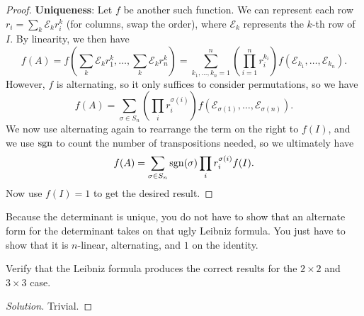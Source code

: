 \begin{proof}
\textbf{Uniqueness}: Let $f$ be another such function. We can represent
each row $r_i = \sum_k \mathcal{E}_k r_i^k$ (for columns, swap the
order), where $\mathcal{E}_k$ represents the $k$-th row of $I$. By
linearity, we then have
\[ f(A) = f\left(\sum_k \mathcal{E}_k r_1^k, \dots, \sum_k \mathcal{E}_k
r_n^k\right) = \sum_{k_1, \dots, k_n = 1}^n \left(\prod_{i = 1}^n
r_i^{k_i}\right) f(\mathcal{E}_{k_1}, \dots, \mathcal{E}_{k_n}). \]
However, $f$ is alternating, so it only suffices to consider
permutations, so we have
\[ f(A) = \sum_{\sigma \in S_n} \left(\prod_i r_i^{\sigma(i)}\right)
f(\mathcal{E}_{\sigma(1)}, \dots, \mathcal{E}_{\sigma(n)}). \]
We now use alternating again to rearrange the term on the right to
$f(I)$, and we use $\operatorname{sgn}$ to count the number of transpositions needed,
so we ultimately have
\[ f(A) = \sum_{\sigma \in S_n} \operatorname{sgn}(\sigma) \prod_i r_i^{\sigma(i)}
f(I). \]
Now use $f(I) = 1$ to get the desired result.
\end{proof}

\begin{rem}
Because the determinant is unique, you do not have to show that an
alternate form for the determinant takes on that ugly Leibniz formula.
You just have to show that it is $n$-linear, alternating, and $1$ on the
identity.
\end{rem}

\begin{prb}
Verify that the Leibniz formula produces the correct results for the $2
\times 2$ and $3 \times 3$ case.
\end{prb}

\begin{proof}[Solution]
Trivial.
\end{proof}
